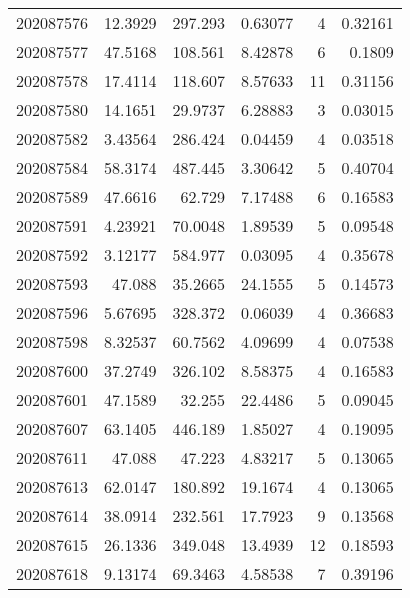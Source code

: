 \begin{tabular}{rrrrrr}
 202087576 &         12.3929  &      297.293  &            0.63077 &           4 & 0.32161 \\
 202087577 &         47.5168  &      108.561  &            8.42878 &           6 & 0.1809  \\
 202087578 &         17.4114  &      118.607  &            8.57633 &          11 & 0.31156 \\
 202087580 &         14.1651  &       29.9737 &            6.28883 &           3 & 0.03015 \\
 202087582 &          3.43564 &      286.424  &            0.04459 &           4 & 0.03518 \\
 202087584 &         58.3174  &      487.445  &            3.30642 &           5 & 0.40704 \\
 202087589 &         47.6616  &       62.729  &            7.17488 &           6 & 0.16583 \\
 202087591 &          4.23921 &       70.0048 &            1.89539 &           5 & 0.09548 \\
 202087592 &          3.12177 &      584.977  &            0.03095 &           4 & 0.35678 \\
 202087593 &         47.088   &       35.2665 &           24.1555  &           5 & 0.14573 \\
 202087596 &          5.67695 &      328.372  &            0.06039 &           4 & 0.36683 \\
 202087598 &          8.32537 &       60.7562 &            4.09699 &           4 & 0.07538 \\
 202087600 &         37.2749  &      326.102  &            8.58375 &           4 & 0.16583 \\
 202087601 &         47.1589  &       32.255  &           22.4486  &           5 & 0.09045 \\
 202087607 &         63.1405  &      446.189  &            1.85027 &           4 & 0.19095 \\
 202087611 &         47.088   &       47.223  &            4.83217 &           5 & 0.13065 \\
 202087613 &         62.0147  &      180.892  &           19.1674  &           4 & 0.13065 \\
 202087614 &         38.0914  &      232.561  &           17.7923  &           9 & 0.13568 \\
 202087615 &         26.1336  &      349.048  &           13.4939  &          12 & 0.18593 \\
 202087618 &          9.13174 &       69.3463 &            4.58538 &           7 & 0.39196 \\

\end{tabular}
